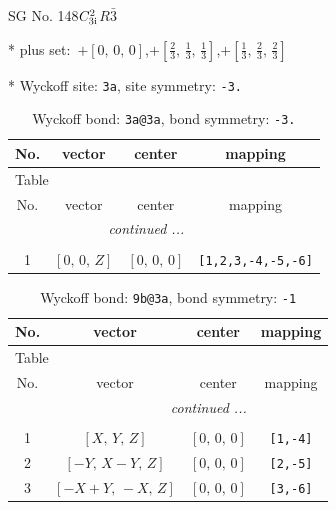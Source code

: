 \documentclass[fleqn,8pt]{jsarticle}
\begin{document}
\setcounter{MaxMatrixCols}{32}

\renewcommand{\tablename}{Table~}
\renewcommand{\figurename}{Figure~}
\begin{center}
\LARGE
SG No. 148\quad$C_{\rm 3i}^{2}$\quad$R\bar{3}$\quad[ trigonal ]
\end{center}

* plus set:\,\,\,$+\left[ 0,\, 0,\, 0 \right]$,\quad $+\left[ \frac{2}{3},\, \frac{1}{3},\, \frac{1}{3} \right]$,\quad $+\left[ \frac{1}{3},\, \frac{2}{3},\, \frac{2}{3} \right]$


* Wyckoff site: {\tt 3a}, site symmetry: {\tt -3.}
\renewcommand{\arraystretch}{1.2}
\begin{longtable}{cccc}
\caption{Wyckoff bond: {\tt 3a@3a}, bond symmetry: {\tt -3.}}
 \\
 \hline \hline
No. & vector & center & mapping \\ \hline \endfirsthead

\multicolumn{3}{l}{\tablename\ \thetable{}} \\
 \hline \hline
No. & vector & center & mapping \\ \hline \endhead

 \hline \hline
\multicolumn{3}{r}{\footnotesize\it continued ...} \\ \endfoot

 \hline \hline
\multicolumn{3}{r}{} \\ \endlastfoot

1 & $\left[ 0,\, 0,\, Z \right]$ & $\left[ 0,\, 0,\, 0 \right]$ & {\tt [1,2,3,-4,-5,-6]} \\
\end{longtable}
\renewcommand{\arraystretch}{1.2}
\begin{longtable}{cccc}
\caption{Wyckoff bond: {\tt 9b@3a}, bond symmetry: {\tt -1}}
 \\
 \hline \hline
No. & vector & center & mapping \\ \hline \endfirsthead

\multicolumn{3}{l}{\tablename\ \thetable{}} \\
 \hline \hline
No. & vector & center & mapping \\ \hline \endhead

 \hline \hline
\multicolumn{3}{r}{\footnotesize\it continued ...} \\ \endfoot

 \hline \hline
\multicolumn{3}{r}{} \\ \endlastfoot

1 & $\left[ X,\, Y,\, Z \right]$ & $\left[ 0,\, 0,\, 0 \right]$ & {\tt [1,-4]} \\ \hline
2 & $\left[ - Y,\, X - Y,\, Z \right]$ & $\left[ 0,\, 0,\, 0 \right]$ & {\tt [2,-5]} \\ \hline
3 & $\left[ - X + Y,\, - X,\, Z \right]$ & $\left[ 0,\, 0,\, 0 \right]$ & {\tt [3,-6]} \\
\end{longtable}
\end{document}
